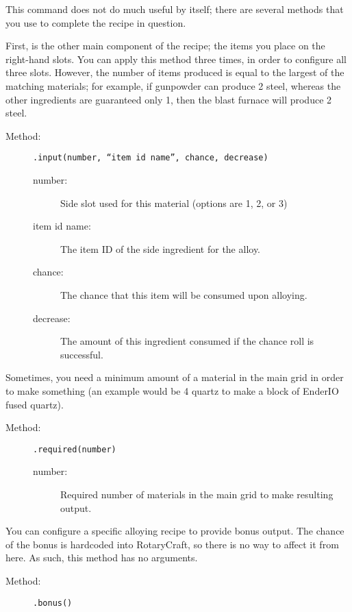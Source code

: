 \documentclass[letterpaper,titlepage,12pt]{article}
\begin{document}
This command does not do much useful by itself; there are several methods that you use to complete the recipe in question.

First, is the other main component of the recipe; the items you place on the right-hand slots.  You can apply this method three times, in order to configure all three slots.  However, the number of items produced is equal to the largest of the matching materials; for example, if gunpowder can produce 2 steel, whereas the other ingredients are guaranteed only 1, then the blast furnace will produce 2 steel. 

\begin{description}
\item[Method:] \texttt{.input(number, ``item id name'', chance, decrease)}
\begin{description}
\item [number:] Side slot used for this material (options are 1, 2, or 3)
\item [item id name:] The item ID of the side ingredient for the alloy.
\item [chance:] The chance that this item will be consumed upon alloying.
\item [decrease:] The amount of this ingredient consumed if the chance roll is successful.
\end{description}
\end{description}

Sometimes, you need a minimum amount of a material in the main grid in order to make something (an example would be 4 quartz to make a block of EnderIO fused quartz).

\begin{description}
\item[Method:] \texttt{.required(number)}
\begin{description}
\item [number:] Required number of materials in the main grid to make resulting output.
\end{description}
\end{description}

You can configure a specific alloying recipe to provide bonus output.  The chance of the bonus is hardcoded into RotaryCraft, so there is no way to affect it from here.  As such, this method has no arguments.

\begin{description}
\item[Method:] \texttt{.bonus()}
\end{description}
\end{document}
